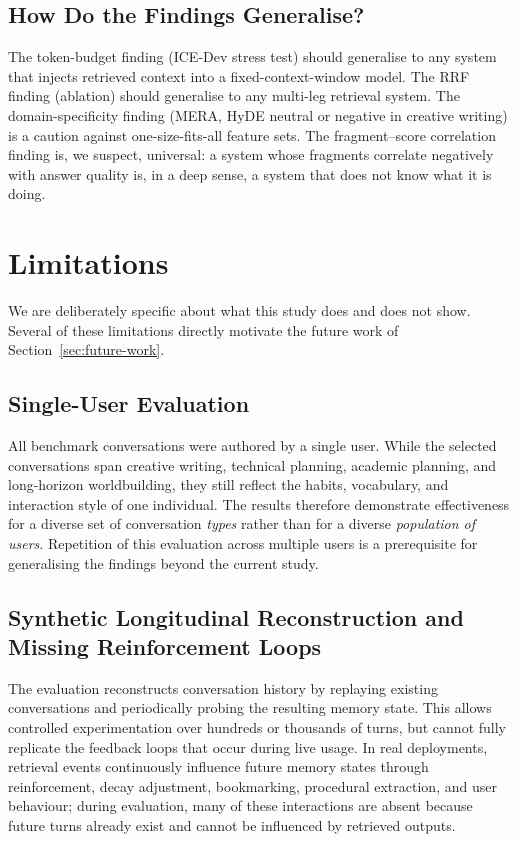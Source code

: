 \documentclass[10pt]{article}
\begin{document}
\subsection{How Do the Findings Generalise?}

The token-budget finding (ICE-Dev stress test) should generalise to any system that injects retrieved context into a fixed-context-window model. The RRF finding (ablation) should generalise to any multi-leg retrieval system. The domain-specificity finding (MERA, HyDE neutral or negative in creative writing) is a caution against one-size-fits-all feature sets. The fragment--score correlation finding is, we suspect, universal: a system whose fragments correlate negatively with answer quality is, in a deep sense, a system that does not know what it is doing.

\section{Limitations}
\label{sec:limitations}

We are deliberately specific about what this study does and does not show. Several of these limitations directly motivate the future work of Section~\ref{sec:future-work}.

\subsection{Single-User Evaluation}
All benchmark conversations were authored by a single user. While the selected conversations span creative writing, technical planning, academic planning, and long-horizon worldbuilding, they still reflect the habits, vocabulary, and interaction style of one individual. The results therefore demonstrate effectiveness for a diverse set of conversation \emph{types} rather than for a diverse \emph{population of users}. Repetition of this evaluation across multiple users is a prerequisite for generalising the findings beyond the current study.

\subsection{Synthetic Longitudinal Reconstruction and Missing Reinforcement Loops}
The evaluation reconstructs conversation history by replaying existing conversations and periodically probing the resulting memory state. This allows controlled experimentation over hundreds or thousands of turns, but cannot fully replicate the feedback loops that occur during live usage. In real deployments, retrieval events continuously influence future memory states through reinforcement, decay adjustment, bookmarking, procedural extraction, and user behaviour; during evaluation, many of these interactions are absent because future turns already exist and cannot be influenced by retrieved outputs.
\end{document}
